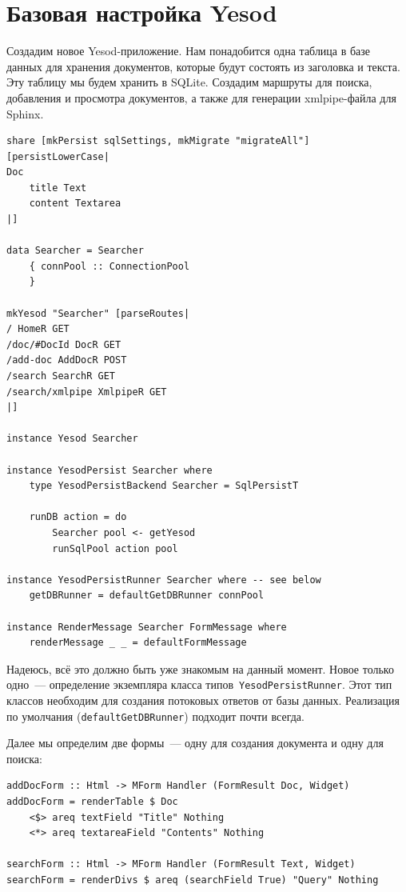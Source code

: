 \section{Базовая настройка Yesod}
Создадим новое Yesod-приложение. Нам понадобится одна таблица в базе данных для
хранения документов, которые будут состоять из заголовка и текста. Эту таблицу
мы будем хранить в SQLite. Создадим маршруты для поиска, добавления и просмотра
документов, а также для генерации xmlpipe-файла для Sphinx.
\begin{lstlisting}
share [mkPersist sqlSettings, mkMigrate "migrateAll"] [persistLowerCase|
Doc
    title Text
    content Textarea
|]

data Searcher = Searcher
    { connPool :: ConnectionPool
    }

mkYesod "Searcher" [parseRoutes|
/ HomeR GET
/doc/#DocId DocR GET
/add-doc AddDocR POST
/search SearchR GET
/search/xmlpipe XmlpipeR GET
|]

instance Yesod Searcher

instance YesodPersist Searcher where
    type YesodPersistBackend Searcher = SqlPersistT

    runDB action = do
        Searcher pool <- getYesod
        runSqlPool action pool

instance YesodPersistRunner Searcher where -- see below
    getDBRunner = defaultGetDBRunner connPool

instance RenderMessage Searcher FormMessage where
    renderMessage _ _ = defaultFormMessage
\end{lstlisting}

Надеюсь, всё это должно быть уже знакомым на данный момент. Новое только
одно~--- определение экземпляра класса типов~\lstinline'YesodPersistRunner'.
Этот тип классов необходим для создания потоковых ответов от базы данных.
Реализация по умолчания (\lstinline'defaultGetDBRunner') подходит почти всегда.

Далее мы определим две формы~--- одну для создания документа и одну для поиска:
\begin{lstlisting}
addDocForm :: Html -> MForm Handler (FormResult Doc, Widget)
addDocForm = renderTable $ Doc
    <$> areq textField "Title" Nothing
    <*> areq textareaField "Contents" Nothing

searchForm :: Html -> MForm Handler (FormResult Text, Widget)
searchForm = renderDivs $ areq (searchField True) "Query" Nothing
\end{lstlisting}%

